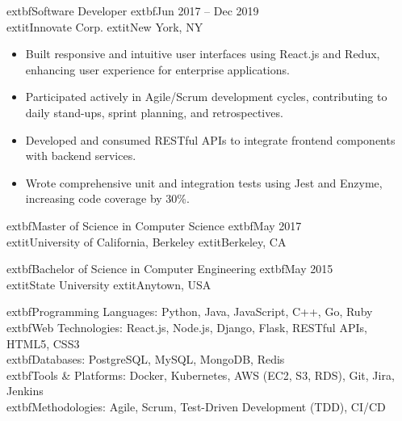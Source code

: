 \documentclass[letterpaper,10pt]{article}
\begin{document}
	extbf{Software Developer} \hfill 	extbf{Jun 2017 – Dec 2019} \\
	extit{Innovate Corp.} \hfill 	extit{New York, NY}
\begin{itemize}
    \item Built responsive and intuitive user interfaces using React.js and Redux, enhancing user experience for enterprise applications.
    \item Participated actively in Agile/Scrum development cycles, contributing to daily stand-ups, sprint planning, and retrospectives.
    \item Developed and consumed RESTful APIs to integrate frontend components with backend services.
    \item Wrote comprehensive unit and integration tests using Jest and Enzyme, increasing code coverage by 30\%.
\end{itemize}


	extbf{Master of Science in Computer Science} \hfill 	extbf{May 2017} \\
	extit{University of California, Berkeley} \hfill 	extit{Berkeley, CA}
\vspace{0.1cm}

	extbf{Bachelor of Science in Computer Engineering} \hfill 	extbf{May 2015} \\
	extit{State University} \hfill 	extit{Anytown, USA}

	extbf{Programming Languages:} Python, Java, JavaScript, C++, Go, Ruby \\
	extbf{Web Technologies:} React.js, Node.js, Django, Flask, RESTful APIs, HTML5, CSS3 \\
	extbf{Databases:} PostgreSQL, MySQL, MongoDB, Redis \\
	extbf{Tools \& Platforms:} Docker, Kubernetes, AWS (EC2, S3, RDS), Git, Jira, Jenkins \\
	extbf{Methodologies:} Agile, Scrum, Test-Driven Development (TDD), CI/CD
\end{document}
